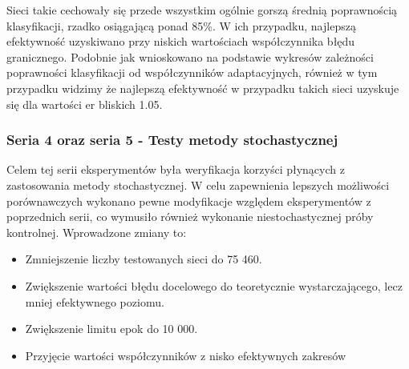 \documentclass[12pt,twoside]{article}
\begin{document}
Sieci takie cechowały się przede wszystkim ogólnie gorszą średnią poprawnością klasyfikacji, rzadko osiągającą ponad 85\%.
W ich przypadku, najlepszą efektywność uzyskiwano przy niskich wartościach współczynnika błędu granicznego.
Podobnie jak wnioskowano na podstawie wykresów zależności poprawności klasyfikacji od współczynników adaptacyjnych,
również w tym przypadku widzimy że najlepszą efektywność w przypadku takich sieci uzyskuje się dla wartości er bliskich 1.05.

\clearpage

\subsubsection{Seria 4 oraz seria 5 - Testy metody stochastycznej}
Celem tej serii eksperymentów była weryfikacja korzyści płynących z zastosowania metody stochastycznej.
W celu zapewnienia lepszych możliwości porównawczych wykonano pewne modyfikacje względem eksperymentów z poprzednich serii, co wymusiło również wykonanie niestochastycznej próby kontrolnej.
Wprowadzone zmiany to:
\begin{itemize}
	\item Zmniejszenie liczby testowanych sieci do 75 460.
	\item Zwiększenie wartości błędu docelowego do teoretycznie wystarczającego, lecz mniej efektywnego poziomu.
	\item Zwiększenie limitu epok do 10 000.
	\item Przyjęcie wartości współczynników z nisko efektywnych zakresów
\end{itemize}
\end{document}
